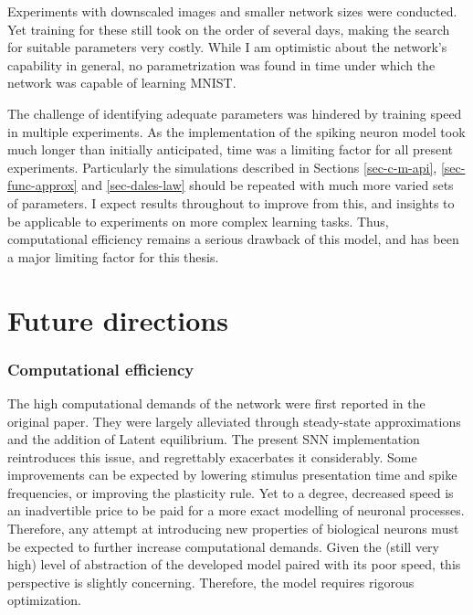 Experiments with downscaled images and smaller network sizes were conducted. Yet training for these still took on the
order of several days, making the search for suitable parameters very costly. While I am optimistic about the network's
capability in general, no parametrization was found in time under which the network was capable of learning MNIST. 


The challenge of identifying adequate parameters was hindered by training speed in multiple experiments. As the
implementation of the spiking neuron model took much longer than initially anticipated, time was a limiting factor for
all present experiments. Particularly the simulations described in Sections \ref{sec-c-m-api}, \ref{sec-func-approx} and
\ref{sec-dales-law} should be repeated with much more varied sets of parameters. I expect results throughout to improve
from this, and insights to be applicable to experiments on more complex learning tasks. Thus, computational efficiency
remains a serious drawback of this model, and has been a major limiting factor for this thesis.


\section{Future directions}

\subsubsection*{Computational efficiency}

The high computational demands of the network were first reported in the original paper. They were largely alleviated
through steady-state approximations and the addition of Latent equilibrium. The present SNN implementation reintroduces
this issue, and regrettably exacerbates it considerably. Some improvements can be expected by lowering stimulus
presentation time and spike frequencies, or improving the plasticity rule. Yet to a degree, decreased speed is an
inadvertible price to be paid for a more exact modelling of neuronal processes. Therefore, any attempt at introducing
new properties of biological neurons must be expected to further increase computational demands. Given the (still very
high) level of abstraction of the developed model paired with its poor speed, this perspective is slightly concerning.
Therefore, the model requires rigorous optimization.

